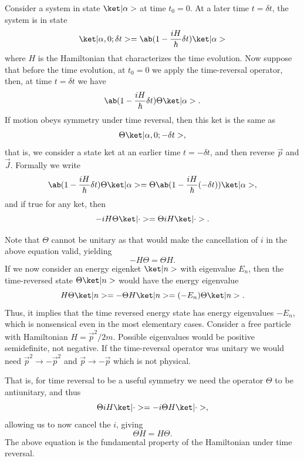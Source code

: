 Consider a system in state $\k{\alpha}$ at time $t_0=0$. At a later time $t=\delta t$, the system is in state
\begin{equation}
    \k{\alpha, 0; \delta t} = \ab(1 - \frac{iH}{\hbar}\delta t) \k{\alpha}
\end{equation}
where $H$ is the Hamiltonian that characterizes the time evolution. Now suppose that before the time evolution, at $t_0=0$ we apply the time-reversal operator, then, at time $t=\delta t$ we have
\begin{equation}
    \ab(1 - \frac{i H}{\hbar} \delta t) \Theta \k{\alpha}.
\end{equation}
If motion obeys symmetry under time reversal, then this ket is the same as
\begin{equation}
    \Theta \k{\alpha, 0; -\delta t},
\end{equation}
that is, we consider a state ket at an earlier time $t = -\delta t$, and then reverse $\vec{p}$ and $\vec{J}$. Formally we write
\begin{equation}
    \ab(1 - \frac{iH}{\hbar} \delta t)\Theta \k{\alpha} = \Theta \ab(1 - \frac{iH}{\hbar} (-\delta t))\k{\alpha},
\end{equation}
and if true for any ket, then
\begin{equation}
    -iH\Theta \k{\cdot} = \Theta i H \k{\cdot}.
\end{equation}

Note that $\Theta$ cannot be unitary as that would make the cancellation of $i$ in the above equation valid, yielding
\begin{equation}
    -H\Theta = \Theta H.
\end{equation}
If we now consider an energy eigenket $\k{n}$ with eigenvalue $E_n$, then the time-reversed state $\Theta \k{n}$ would have the energy eigenvalue
\begin{equation}
    H\Theta\k{n} = -\Theta H\k{n} = (-E_n)\Theta\k{n}.
\end{equation}
Thus, it implies that the time reversed energy state has energy eigenvalues $-E_n$, which is nonsensical even in the most elementary cases. Consider a free particle with Hamiltonian $H = \vec{p}^2/2m$. Possible eigenvalues would be positive semidefinite, not negative. If the time-reversal operator was unitary we would need $\vec{p}^2 \to -\vec{p}^2$ and $\vec{p}\to -\vec{p}$ which is not physical.

That is, for time reversal to be a useful symmetry we need the operator $\Theta$ to be antiunitary, and thus
\begin{equation}
    \Theta i H \k{\cdot} = - i \Theta H \k{\cdot},
\end{equation}
allowing us to now cancel the $i$, giving
\begin{equation}
    \Theta H = H\Theta.
\end{equation}
The above equation is the fundamental property of the Hamiltonian under time reversal.

